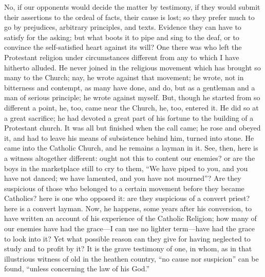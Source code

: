 No, if our opponents would decide the matter by
testimony, if they would submit their assertions to the
ordeal of facts, their cause is lost; so they prefer much
to go by prejudices, arbitrary principles, and texts.
Evidence they can have to satisfy for the asking; but
what boots it to pipe and sing to the deaf, or to
convince the self-satisfied heart against its will? One
there was who left the Protestant religion under
circumstances different from any to which I have hitherto
alluded. He never joined in the religious movement which
has brought so many to the Church; nay, he wrote against
that movement; he wrote, not in bitterness and contempt,
as many have done, and do, but as a gentleman and a man
of serious principle; he wrote against myself. But,
though he started from so different a point, he, too,
came near the Church, he, too, entered it. He did so at a
great sacrifice; he had devoted a great part of his
fortune to the building of a Protestant church. It was
all but finished when the call came; he rose and obeyed
it, and had to leave his means of subsistence behind him,
turned into stone. He came into the Catholic Church, and
he remains a layman in it. See, then, here is a witness
altogether different: ought not this to content our
enemies? or are the boys in the marketplace still to cry
to them, ``We have piped to you, and you have not
danced; we have lamented, and you have not mourned''?
Are they suspicious of those who belonged to a certain
movement before they became Catholics? here is one who
opposed it: are they suspicious of a convert priest? here
is a convert layman. Now, he happens, some years after
his conversion, to have written an account of his
experience of the Catholic Religion; how many of our
enemies have had the grace—I can use no lighter term—have had the grace to look into it? Yet what
possible reason can they give for having neglected to
study and to profit by it? It is the grave testimony of
one, in whom, as in that illustrious witness of old in
the heathen country, ``no cause nor suspicion''
can be found, ``unless concerning the law of his
God.''

